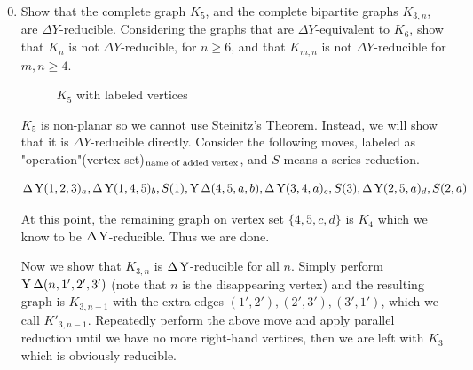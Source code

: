 \documentclass{article}
\begin{document}
\begin{enumerate}
\setcounter{enumi}{-1}
\renewcommand{\labelenumi}{4.\arabic{enumi}}

\item Show that the complete graph $K_{5}$, and the complete bipartite graphs $K_{3,n}$, are $\Delta Y$-reducible. Considering the graphs that are $\Delta Y$-equivalent to $K_{6}$, show that $K_{n}$ is not $\Delta Y$-reducible, for $n \ge 6$, and that $K_{m,n}$ is not $\Delta Y$-reducible for $m,n \ge 4$.

\begin{solution}
\begin{figure}[h]
    \centering
{}

\caption{$K_5$ with labeled vertices}
\end{figure}

$K_5$ is non-planar so we cannot use Steinitz's Theorem. Instead, we will show that it is $\Delta Y$-reducible directly. Consider the following moves, labeled as "operation"(vertex set)$_{\textup{name of added vertex}}$, and $S$ means a series reduction.

\[\Delta \operatorname{Y}(1,2,3)_a, \Delta \operatorname{Y}(1,4,5)_b, S(1), \operatorname{Y}\Delta(4,5,a,b), \Delta \operatorname{Y}(3,4,a)_c, S(3), \Delta \operatorname{Y}(2,5,a)_d, S(2,a)\]

At this point, the remaining graph on vertex set $\{4,5,c,d\}$ is $K_4$ which we know to be $\Delta \operatorname{Y}$-reducible. Thus we are done.

Now we show that $K_{3,n}$ is $\Delta \operatorname{Y}$-reducible for all $n$. Simply perform $\operatorname{Y}\Delta(n,1',2',3')$ (note that $n$ is the disappearing vertex) and the resulting graph is $K_{3,n-1}$ with the extra edges $(1', 2'), (2',3'), (3',1')$, which we call $K'_{3,n-1}$. Repeatedly perform the above move and apply parallel reduction until we have no more right-hand vertices, then we are left with $K_3$ which is obviously reducible.

\begin{figure}[h]
    \centering
{}
\end{figure}
\end{solution}
\end{enumerate}
\end{document}
